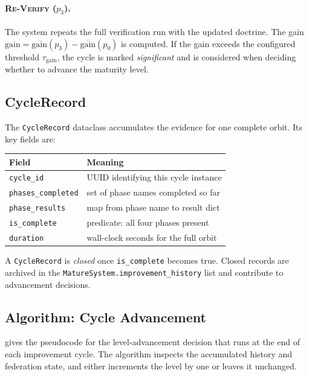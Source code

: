 \documentclass[11pt]{article}
\newcommand{\gain}{\mathrm{gain}}           %
\newcommand{\ReVerify}{\textsc{Re-Verify}}
\newcommand{\gainT}{\tau_{\mathrm{gain}}}
\begin{document}
\paragraph{\ReVerify{} ($p_3$).}  The system repeats the full verification
run with the updated doctrine.  The gain
$\gain = \overline{\gain}(p_3) - \overline{\gain}(p_0)$
is computed.  If the gain exceeds the configured threshold $\gainT$, the
cycle is marked \emph{significant} and is considered when deciding whether
to advance the maturity level.

\subsection{CycleRecord}

The \texttt{CycleRecord} dataclass accumulates the evidence for one complete
orbit.  Its key fields are:

\begin{center}
\begin{tabularx}{0.9\linewidth}{lX}
\toprule
\textbf{Field} & \textbf{Meaning} \\
\midrule
\texttt{cycle\_id}      & UUID identifying this cycle instance \\
\texttt{phases\_completed} & set of phase names completed so far \\
\texttt{phase\_results} & map from phase name to result dict \\
\texttt{is\_complete}   & predicate: all four phases present \\
\texttt{duration}       & wall-clock seconds for the full orbit \\
\bottomrule
\end{tabularx}
\end{center}

A \texttt{CycleRecord} is \emph{closed} once \texttt{is\_complete} becomes
true.  Closed records are archived in the \texttt{MatureSystem.improvement\_history}
list and contribute to advancement decisions.

\subsection{Algorithm: Cycle Advancement}\label{sec:algo-advance}

 gives the pseudocode for the level-advancement decision
that runs at the end of each improvement cycle.  The algorithm inspects the
accumulated history and federation state, and either increments the level
by one or leaves it unchanged.
\end{document}
